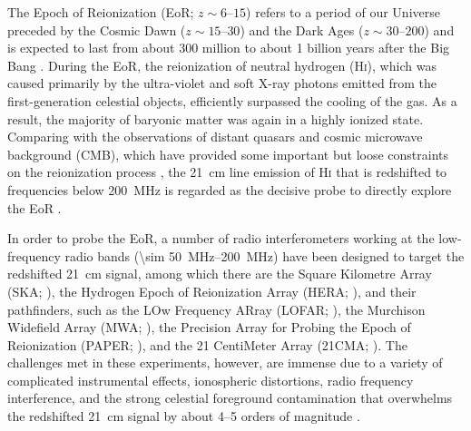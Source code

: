 \documentclass[twocolumn]{aastex62}
\newcommand{\Hi}{H\textsc{i}}
\begin{document}
The Epoch of Reionization (EoR; $z \sim \numrange{6}{15}$) refers to
a period of our Universe preceded by the Cosmic Dawn
($z \sim \numrange{15}{30}$) and the Dark Ages ($z \sim \numrange{30}{200}$)
and is expected to last from about 300 million to about 1 billion years
after the Big Bang \citep[see][and references therein]{koopmans2015rev}.
During the EoR, the reionization of neutral hydrogen (\Hi), which was
caused primarily by the ultra-violet and soft X-ray photons emitted from
the first-generation celestial objects, efficiently surpassed the cooling
of the gas.
As a result, the majority of baryonic matter was again in a highly ionized
state.
Comparing with the observations of distant quasars and cosmic microwave
background (CMB), which have provided some important but loose constraints
on the reionization process \citep[see][for a review]{fan2006rev},
the 21~cm line emission of \Hi{} that is redshifted to frequencies below
\SI{200}{\MHz} is regarded as the decisive probe to directly explore the EoR
\citep[see][for reviews]{furlanetto2006rev,zaroubi2013rev,furlanetto2016rev}.

In order to probe the EoR, a number of radio interferometers working
at the low-frequency radio bands (\SIrange{\sim 50}{200}{\MHz}) have been
designed to target the redshifted 21~cm signal, among which there are
the Square Kilometre Array (SKA; \citealt{mellema2013rev,koopmans2015rev}),
the Hydrogen Epoch of Reionization Array (HERA; \citealt{deboer2017}),
and their pathfinders, such as
the LOw Frequency ARray (LOFAR; \citealt{vanHaarlem2013}),
the Murchison Widefield Array (MWA; \citealt{bowman2013,tingay2013}),
the Precision Array for Probing the Epoch of Reionization
(PAPER; \citealt{parsons2010}),
and the 21 CentiMeter Array (21CMA; \citealt{zheng2016}).
The challenges met in these experiments, however, are immense
due to a variety of complicated instrumental effects,
ionospheric distortions, radio frequency interference, and the
strong celestial foreground contamination that overwhelms the
redshifted 21~cm signal by about \numrange{4}{5} orders of magnitude
\citep[see][for a review]{morales2010rev}.
\end{document}
